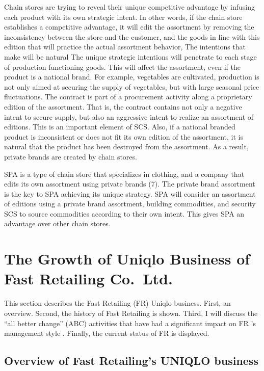 \documentclass[12pt,]{article}
\begin{document}
Chain stores are trying to reveal their unique competitive advantage by
infusing each product with its own strategic intent. In other words, if
the chain store establishes a competitive advantage, it will edit the
assortment by removing the inconsistency between the store and the
customer, and the goods in line with this edition that will practice the
actual assortment behavior, The intentions that make will be natural The
unique strategic intentions will penetrate to each stage of production
functioning goods. This will affect the assortment, even if the product
is a national brand. For example, vegetables are cultivated, production
is not only aimed at securing the supply of vegetables, but with large
seasonal price fluctuations. The contract is part of a procurement
activity along a proprietary edition of the assortment. That is, the
contract contains not only a negative intent to secure supply, but also
an aggressive intent to realize an assortment of editions. This is an
important element of SCS. Also, if a national branded product is
inconsistent or does not fit its own edition of the assortment, it is
natural that the product has been destroyed from the assortment. As a
result, private brands are created by chain stores.

SPA is a type of chain store that specializes in clothing, and a company
that edits its own assortment using private brands (7). The private
brand assortment is the key to SPA achieving its unique strategy. SPA
will consider an assortment of editions using a private brand
assortment, building commodities, and security SCS to source commodities
according to their own intent. This gives SPA an advantage over other
chain stores.

\hypertarget{the-growth-of-uniqlo-business-of-fast-retailing-co.ltd.}{%
\section{The Growth of Uniqlo Business of Fast Retailing
Co.~Ltd.}\label{the-growth-of-uniqlo-business-of-fast-retailing-co.ltd.}}

This section describes the Fast Retailing (FR) Uniqlo business. First,
an overview. Second, the history of Fast Retailing is shown. Third, I
will discuss the ``all better change'' (ABC) activities that have had a
significant impact on FR 's management style . Finally, the current
status of FR is displayed.

\hypertarget{overview-of-fast-retailings-uniqlo-business}{%
\subsection{Overview of Fast Retailing's UNIQLO
business}\label{overview-of-fast-retailings-uniqlo-business}}
\end{document}

